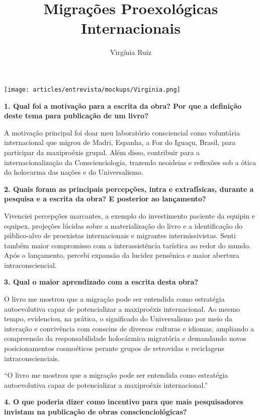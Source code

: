 \documentclass{gescons}
\author{Virgínia Ruiz}
\title{Migrações Proexológicas Internacionais}
\begin{document}
    \makeentrevistatitle

    \begin{multicols}{2}


\begin{center}
    \texttt{[image: articles/entrevista/mockups/Virginia.png]}
\end{center}


\textbf{1.       Qual foi a motivação para a escrita da obra? Por que a definição deste tema para publicação de um livro?}

A motivação principal foi doar meu laboratório consciencial como voluntária internacional que migrou de Madri, Espanha, a Foz do Iguaçu, Brasil, para participar da maxiproéxis grupal. Além disso, contribuir para a internacionalização da Conscienciologia, trazendo neoideias e reflexões sob a ótica do holocarma das nações e do Universalismo.


\textbf{2.       Quais foram as principais percepções, intra e extrafísicas, durante a pesquisa e a escrita da obra? E posterior ao lançamento?}

Vivenciei percepções marcantes, a exemplo do investimento paciente da equipin e equipex, projeções lúcidas sobre a materialização do livro e a identificação do público-alvo de proexistas internacionais e migrantes intermissivistas. Senti também maior compromisso com a interassistência tarística ao redor do mundo. Após o lançamento, percebi expansão da lucidez pensênica e maior abertura intraconsciencial.


\textbf{3.       Qual o maior aprendizado com a escrita desta obra?}

O livro me mostrou que a migração pode ser entendida como estratégia autoevolutiva capaz de potencializar a maxiproéxis internacional. Ao mesmo tempo, evidenciou, na prática, o significado do Universalismo por meio da interação e convivência com conscins de diversas culturas e idiomas, ampliando a compreensão da responsabilidade holocármica migratória e demandando novos posicionamentos cosmoéticos perante grupos de retrovidas e reciclagens intraconscienciais.

\begin{pullquote}
    ``O livro me mostrou que a migração pode ser entendida como estratégia autoevolutiva capaz de potencializar a maxiproéxis internacional.''
\end{pullquote}

\textbf{4.       O que poderia dizer como incentivo para que mais pesquisadores invistam na publicação de obras conscienciológicas?}


\end{multicols}
\end{document}

